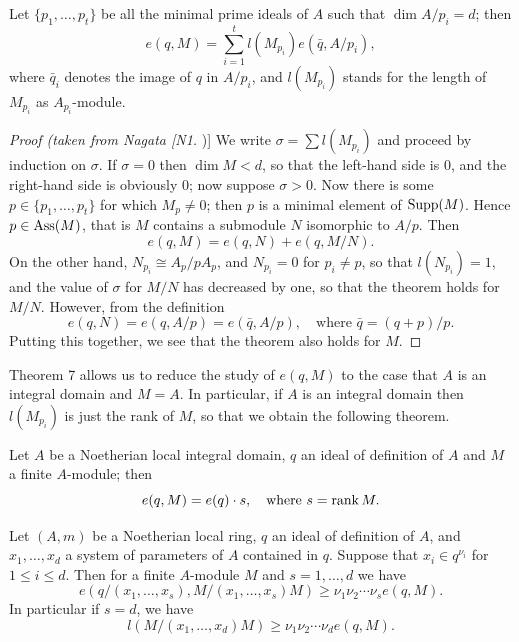 \begin{theorem}\label{thm:14.7}
Let $\{p_1, \ldots, p_t\}$ be all the minimal prime ideals of $A$ such
that $\dim A/p_i = d$; then
\[
  e(q, M) = \sum_{i=1}^{t} l(M_{p_i})e(\bar{q}, A/p_i),
\]
where $\bar{q}_i$ denotes the image of $q$ in $A/p_i$, and $l(M_{p_i})$ stands for the length of $M_{p_i}$ as
$A_{p_i}$-module.
\end{theorem}

\begin{proof}[Proof (taken from Nagata [N1])]
We write $\sigma = \sum l(M_{p_i})$ and proceed by
induction on $\sigma$. If $\sigma = 0$ then $\dim M < d$, so that the left-hand side is $0$, and
the right-hand side is obviously $0$; now suppose $\sigma > 0$. Now there is some
$p \in \{p_1, \ldots, p_t\}$ for which $M_p \neq 0$; then $p$ is a minimal element of
$\operatorname{Supp}(M)$. Hence $p \in \operatorname{Ass}(M)$, that is $M$ contains a submodule $N$ isomorphic
to $A/p$. Then
\[
  e(q, M) = e(q, N) + e(q, M/N).
\]
On the other hand, $N_{p_i} \cong A_p/pA_p$, and $N_{p_i} = 0$ for $p_i \neq p$, so that $l(N_{p_i}) = 1$,
and the value of $\sigma$ for $M/N$ has decreased by one, so that the theorem holds
for $M/N$. However, from the definition
\[
  e(q, N) = e(q, A/p) = e(\bar{q}, A/p), \quad \text{where } \bar{q} = (q + p)/p.
\]
Putting this together, we see that the theorem also holds for $M$.
\end{proof}

Theorem 7 allows us to reduce the study of $e(q, M)$ to the case that $A$ is an
integral domain and $M = A$. In particular, if $A$ is an integral domain then
$l(M_{p_i})$ is just the rank of $M$, so that we obtain the following theorem.

\begin{theorem}\label{thm:14.8}
Let $A$ be a Noetherian local integral domain, $q$ an ideal of
definition of $A$ and $M$ a finite $A$-module; then
\[
  e(q, M) = e(q) \cdot s, \quad \text{where } s = \operatorname{rank} M.
\]
\end{theorem}

\begin{theorem}\label{thm:14.9}
Let $(A, m)$ be a Noetherian local ring, $q$ an ideal of definition
of $A$, and $x_1, \ldots, x_d$ a system of parameters of $A$ contained in $q$. Suppose that
$x_i \in q^{\nu_i}$ for $1 \le i \le d$. Then for a finite $A$-module $M$ and $s = 1, \ldots, d$ we have
\[
  e(q/(x_1, \ldots, x_s), M/(x_1, \ldots, x_s)M) \ge \nu_1\nu_2 \cdots \nu_s e(q, M).
\]
In particular if $s = d$, we have
\[
  l(M/(x_1, \ldots, x_d)M) \ge \nu_1\nu_2 \cdots \nu_de(q, M).
\]
\end{theorem}

